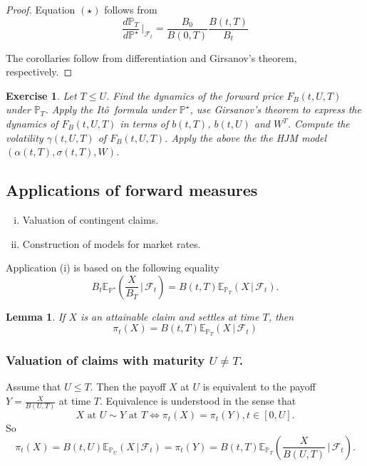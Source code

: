 \documentclass[10pt, oneside, reqno]{amsbook}
\theoremstyle{plain}%
\newtheorem{lem}[thm]{Lemma}
\newtheorem{exer}[thm]{Exercise}
\theoremstyle{definition}
\theoremstyle{remark}
\newcommand{\given}{ \, | \,}
\newcommand{\sigf}{\mathcal{F}}
\newcommand{\E}{\mathbb{E}}
\renewcommand{\P}{\mathbb{P}}
\newcommand{\ito}{It\^o\ }
\numberwithin{equation}{chapter}
\begin{document}
\begin{proof}
    Equation $(\star)$ follows from \[
        \frac{d\P_T}{d\P^\star} \, |_{\sigf_t} = \frac{B_0}{B(0, T)} \frac{B(t, T)}{B_t}
    \]  
    
    The corollaries follow from differentiation and Girsanov's theorem, respectively.
\end{proof}

\begin{exer}
    Let $T \leq U$.  Find the dynamics of the forward price $F_B(t, U , T)$ under $\P_T$.  Apply the \ito formula under $\P^\star$, use Girsanov's theorem to express the dynamics of $F_B(t, U, T)$ in terms of $b(t, T)$, $b(t, U)$ and $W^T$.  Compute the volatility $\gamma(t, U ,T)$ of $F_B(t, U, T)$.  Apply the above the the HJM model $(\alpha(t, T), \sigma(t, T), W)$.
\end{exer}

\subsection{Applications of forward measures} %
\label{sub:applications_of_forward_measures}
\begin{enumerate}[(i)]
    \item Valuation of contingent claims.
    \item Construction of models for market rates.
\end{enumerate}  Application (i) is based on the following equality \[
    B_t \E_{\P^\star} \left( \frac{X}{B_T} \given \sigf_t \right) = B(t, T) \E_{\P_T} \left( X \given \sigf_t \right).
\]

\begin{lem}
    If $X$ is an attainable claim and settles at time $T$, then \[
        \pi_t(X) = B(t, T) \E_{\P_T} \left( X \given \sigf_t \right)
    \]
\end{lem}

\subsubsection{Valuation of claims with maturity $U \neq T$.}
Assume that $U \leq T$. Then the payoff $X$ at $U$ is equivalent to the payoff $Y = \frac{X}{B(U, T)}$ at time $T$.  Equivalence is understood in the sense that \[
    \text{$X$ at $U$} \sim \text{$Y$ at $T$} \iff \pi_t(X) = \pi_t(Y), t \in [0, U].
\]  So \[
    \pi_t(X) = B(t, U) \E_{\P_U} \left( X \given \sigf_t \right) = \pi_t(Y) = B(t, T) \E_{\P_T} \left( \frac{X}{B(U, T)} \given \sigf_t \right).
\]
\end{document}
